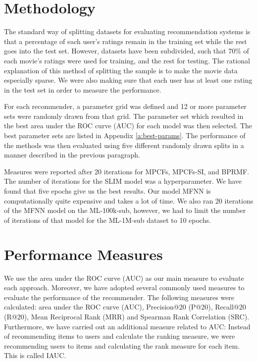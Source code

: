 \section{Methodology}
\label{st:methodology}
The standard way of splitting datasets for evaluating recommendation systems is that a percentage of each user's ratings remain in the training set while the rest goes into the test set.
However, datasets have been subdivided, such that 70\% of each movie's ratings were used for training, and the rest for testing.
The rational explanation of this method of splitting the sample is to make the movie data especially sparse.
We were also making sure that each user has at least one rating in the test set in order to measure the performance.

For each recommender, a parameter grid was defined and 12 or more parameter sets were randomly drawn from that grid.
The parameter set which resulted in the best area under the ROC curve (AUC) for each model was then selected.
The best parameter sets are listed in Appendix \ref{a:best-params}.
The performance of the methods was then evaluated using five different randomly drawn splits in a manner described in the previous paragraph.

Measures were reported after 20 iterations for MPCFs, MPCFs-SI, and BPRMF.
The number of iterations for the SLIM model was a hyperparameter.
We have found that five epochs give us the best results.
Our model MFNN is computationally quite expensive and takes a lot of time.
We also ran 20 iterations of the MFNN model on the ML-100k-sub, however, we had to limit the number of iterations of that model for the ML-1M-sub dataset to 10 epochs.

\section{Performance Measures}
\label{st:performance-measures}
We use the area under the ROC curve (AUC) as our main measure to evaluate each approach.
Moreover, we have adopted several commonly used measures to evaluate the performance of the recommender.
The following measures were calculated: area under the ROC curve (AUC), Precision@20 (P@20), Recall@20 (R@20), Mean Reciprocal Rank (MRR) and Spearman Rank Correlation (SRC).
Furthermore, we have carried out an additional measure related to AUC: Instead of recommending items to users and calculate the ranking measure, we were recommending users to items and calculating the rank measure for each item.
This is called IAUC.


